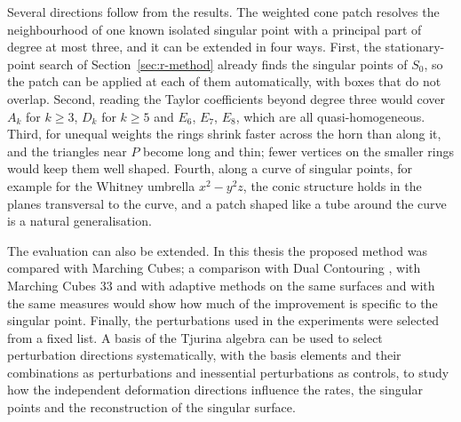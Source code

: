 \documentclass[12pt, a4paper, oneside]{book}
\theoremstyle{plain}
\theoremstyle{definition}
\theoremstyle{remark}
\theoremstyle{definition}
\begin{document}
Several directions follow from the results. The weighted cone patch resolves the neighbourhood of one known isolated singular point with a principal part of degree at most three, and it can be extended in four ways. First, the stationary-point search of Section~\ref{sec:r-method} already finds the singular points of $S_0$, so the patch can be applied at each of them automatically, with boxes that do not overlap. Second, reading the Taylor coefficients beyond degree three would cover $A_k$ for $k\ge3$, $D_k$ for $k\ge5$ and $E_6$, $E_7$, $E_8$, which are all quasi-homogeneous. Third, for unequal weights the rings shrink faster across the horn than along it, and the triangles near $P$ become long and thin; fewer vertices on the smaller rings would keep them well shaped. Fourth, along a curve of singular points, for example for the Whitney umbrella $x^2-y^2z$, the conic structure holds in the planes transversal to the curve, and a patch shaped like a tube around the curve is a natural generalisation.

The evaluation can also be extended. In this thesis the proposed method was compared with Marching Cubes; a comparison with Dual Contouring \cite{ju2002dual}, with Marching Cubes 33 \cite{chernyaev1995marching,lewiner2003efficient} and with adaptive methods \cite{frisken2000adaptively} on the same surfaces and with the same measures would show how much of the improvement is specific to the singular point. Finally, the perturbations used in the experiments were selected from a fixed list. A basis of the Tjurina algebra can be used to select perturbation directions systematically, with the basis elements and their combinations as perturbations and inessential perturbations as controls, to study how the independent deformation directions influence the rates, the singular points and the reconstruction of the singular surface.





%
% 
%

\newpage


\end{document}
